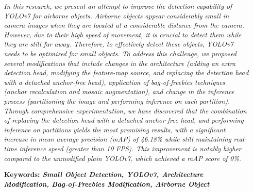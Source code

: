{
  \itshape
  In this research, we present an attempt to improve the detection capability of YOLOv7 for airborne objects. 
  Airborne objects appear considerably small in camera images when they are located at a considerable distance from the camera. 
  However, due to their high speed of movement, it is crucial to detect them while they are still far away. 
  Therefore, to effectively detect these objects, YOLOv7 needs to be optimized for small objects.
  To address this challenge, we proposed several modifications that include changes in the architecture (adding an extra detection head, modifying the feature-map source, and replacing the detection head with a detached anchor-free head), application of bag-of-freebies techniques (anchor recalculation and mosaic augmentation), and change in the inference process (partitioning the image and performing inference on each partition).
  Through comprehensive experimentation, we have discovered that the combination of replacing the detection head with a detached anchor-free head, and performing inference on partitions yields the most promising results, with a significant increase in mean average precision (mAP) of 46.18\% while still maintaining real-time inference speed (greater than 10 FPS).
  This improvement is notably higher compared to the unmodified plain YOLOv7, which achieved a mAP score of 0\%.
}

\noindent
\textbf{Keywords: \emph{Small Object Detection, YOLOv7, Architecture Modification, Bag-of-Freebies Modification, Airborne Object}}
